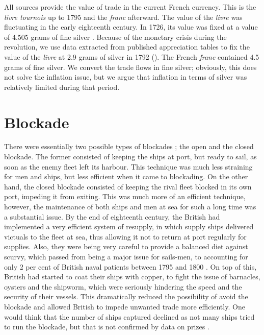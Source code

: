\documentclass[12pt,a4paper,notitlepage,english]{article}
\begin{document}
\begin{appendix}
All sources provide the value of trade in the current French currency. This is the \textit{livre tournois} up to 1795 and the \textit{franc} afterward. The value of the \textit{livre} was fluctuating in the early eighteenth century. In 1726, its value was fixed at a value of 4.505 grams of fine silver \citep{Dewailly1857}. Because of the monetary crisis during the revolution, we use data extracted from published appreciation tables to fix the value of the \textit{livre} at 2.9 grams of silver in 1792 (\cite{Hoffman2000}). The French \textit{franc} contained 4.5 grams of fine silver. We convert the trade flows in fine silver; obviously, this does not solve the inflation issue, but we argue that inflation in terms of silver was relatively limited during that period. 

\section{Blockade}\label{app:appendix_blockade}
There were essentially two possible types of blockades \citep{Corbett2004}; the open and the closed blockade. The former consisted of keeping the ships at port, but ready to sail, as soon as the enemy fleet left its harbour. This technique was much less straining for men and ships, but less efficient when it came to blockading. On the other hand, the closed blockade consisted of keeping the rival fleet blocked in its own port, impeding it from exiting. This was much more of an efficient technique, however, the maintenance of both ships and men at sea for such a long time was a substantial issue.
By the end of eighteenth century, the British had implemented a very efficient system of resupply, in which supply ships delivered victuals to the fleet at sea, thus allowing it not to return at port regularly for supplies. 
Also, they were being very careful to provide a balanced diet against scurvy, which passed from being a major issue for sails-men, to accounting for only 2 per cent of British naval patients between 1795 and 1800 \citep{Rodger2005}. On top of this, British had started to coat their ships with copper, to fight the issue of barnacles, oysters and the shipworm, which were seriously hindering the speed and the security of their vessels. This dramatically reduced the possibility of avoid the blockade and allowed British to impede unwanted trade more efficiently.
One would think that the number of ships captured declined as not many ships tried to run the blockade, but that is not confirmed by data on prizes \cite{Benjamin2009}.


\end{appendix}
\end{document}
